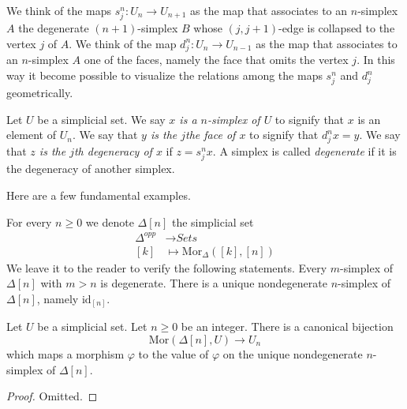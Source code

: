 \medskip\noindent
We think of the maps $s^n_j : U_n \to U_{n + 1}$ as
the map that associates to an $n$-simplex $A$ the degenerate
$(n + 1)$-simplex $B$ whose $(j, j + 1)$-edge is collapsed
to the vertex $j$ of $A$. We think of the map $d^n_j : U_n \to U_{n - 1}$
as the map that associates to an $n$-simplex $A$ one of the
faces, namely the face that omits the vertex $j$.
In this way it become possible to visualize the relations
among the maps $s^n_j$ and $d^n_j$ geometrically.

\begin{definition}
\label{definition-terminology-simplicial-sets}
Let $U$ be a simplicial set. 
We say {\it $x$ is a $n$-simplex of $U$} to signify that
$x$ is an element of $U_n$. We say that {\it $y$ is the $j$the
face of $x$} to signify that $d^n_jx = y$. We say that
{\it $z$ is the $j$th degeneracy of $x$} if $z = s^n_jx$.
A simplex is called {\it degenerate} if it is the degeneracy
of another simplex.
\end{definition}

\noindent
Here are a few fundamental examples.

\begin{example}
\label{example-simplex-simplicial-set}
For every $n \geq 0$ we denote $\Delta[n]$ the simplicial set
\begin{align*}
\Delta^{opp} & \longrightarrow \textit{Sets} \\
[k] & \longmapsto \text{Mor}_{\Delta}([k], [n])
\end{align*}
We leave it to the reader to verify the following statements.
Every $m$-simplex of $\Delta[n]$ with $m > n$ is degenerate.
There is a unique nondegenerate $n$-simplex of $\Delta[n]$,
namely $\text{id}_{[n]}$.
\end{example}

\begin{lemma}
\label{lemma-simplex-map}
Let $U$ be a simplicial set. Let $n \geq 0$ be an integer.
There is a canonical bijection
$$
\text{Mor}(\Delta[n], U)
\longrightarrow
U_n
$$
which maps a morphism $\varphi$ to the value of $\varphi$
on the unique nondegenerate $n$-simplex of $\Delta[n]$.
\end{lemma}

\begin{proof}
Omitted.
\end{proof}

